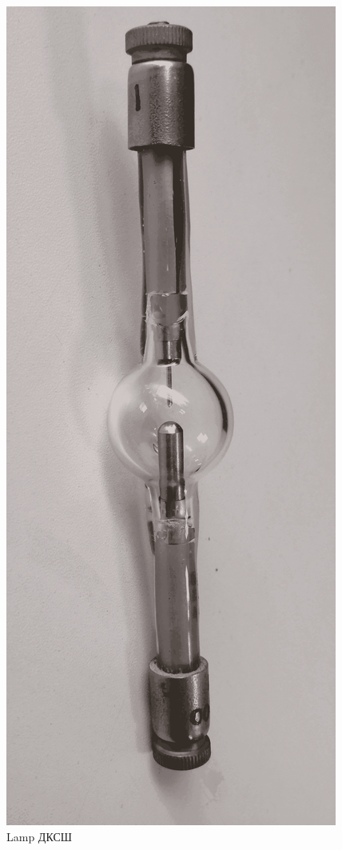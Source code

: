 \documentclass{beamer}
\begin{document}
\begin{frame}
\begin{columns}
\begin{figure}
				\includegraphics[width=\linewidth]{res/lamp_spherical_xe.png}
				\caption*{Lamp ДКСШ}
			\end{figure}
		\end{columns}
	\end{frame}	
	
\end{document}
